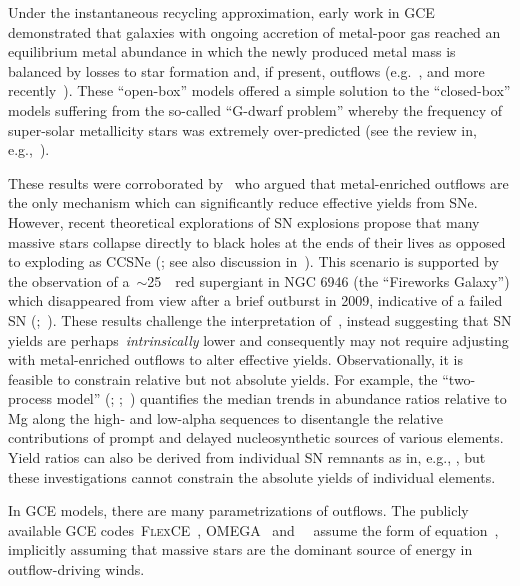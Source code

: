 \documentclass[ms.tex]{subfiles}
\begin{document}
Under the instantaneous recycling approximation, early work in GCE demonstrated
that galaxies with ongoing accretion of metal-poor gas reached an equilibrium
metal abundance in which the newly produced metal mass is balanced by losses to
star formation and, if present, outflows (e.g.~\citealp{Larson1972}, and more
recently~\citealp{Weinberg2017}).
These ``open-box'' models offered a simple solution to the ``closed-box''
models suffering from the so-called ``G-dwarf problem'' whereby the frequency
of super-solar metallicity stars was extremely over-predicted (see the review
in, e.g.,~\citealp{Tinsley1980}).
\par
These results were corroborated by~\citet{Dalcanton2007} who argued that
metal-enriched outflows are the only mechanism which can significantly reduce
effective yields from SNe.
However, recent theoretical explorations of SN explosions propose that many
massive stars collapse directly to black holes at the ends of their lives
as opposed to exploding as CCSNe (\citealp{OConnor2011, Pejcha2015, Ertl2016,
Sukhbold2016}; see also discussion in~\citealp{Griffith2021}).
This scenario is supported by the observation of a~$\sim$25~\msun~red
supergiant in NGC 6946 (the ``Fireworks Galaxy'') which disappeared from view
after a brief outburst in 2009, indicative of a failed SN
(\citealp*{Gerke2015};~\citealp{Adams2017, Basinger2021}).
These results challenge the interpretation of~\citet{Dalcanton2007}, instead
suggesting that SN yields are perhaps~\textit{intrinsically} lower and
consequently may not require adjusting with metal-enriched outflows to alter
effective yields.
Observationally, it is feasible to constrain relative but not absolute yields.
For example, the ``two-process model'' (\citealp{Weinberg2019, Weinberg2022};
\citealp*{Griffith2019};~\citealp{Griffith2022}) quantifies the median trends
in abundance ratios relative to Mg along the high- and low-alpha sequences to
disentangle the relative contributions of prompt and delayed nucleosynthetic
sources of various elements.
Yield ratios can also be derived from individual SN remnants as in, e.g.,
\citet*{HollandAshford2020}, but these investigations cannot constrain the
absolute yields of individual elements.
\par
In GCE models, there are many parametrizations of outflows.
The publicly available GCE codes~\textsc{FlexCE}~\citep{Andrews2017},
\textsc{OMEGA}~\citep{Cote2017} and~\vice~\citep{Johnson2020} assume the form
of equation~, implicitly assuming that massive stars are
the dominant source of energy in outflow-driving winds.
\end{document}
